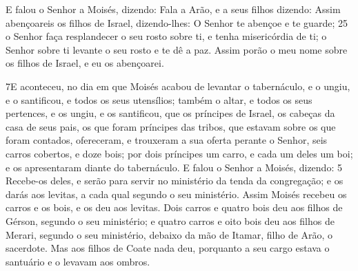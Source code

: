 E falou o Senhor a Moisés, dizendo: Fala a Arão, e a seus
filhos dizendo: Assim abençoareis os filhos de Israel, dizendo-lhes:
O Senhor te abençoe e te guarde; 25 o Senhor faça
resplandecer o seu rosto sobre ti, e tenha misericórdia de ti;
o Senhor sobre ti levante o seu rosto e te dê a paz.
Assim porão o meu nome sobre os filhos de Israel, e eu os
abençoarei.

\medskip

\lettrine{7} E aconteceu, no dia em que Moisés acabou de
levantar o tabernáculo, e o ungiu, e o santificou, e todos os seus
utensílios; também o altar, e todos os seus pertences, e os ungiu, e
os santificou, que os príncipes de Israel, os cabeças da casa de
seus pais, os que foram príncipes das tribos, que estavam sobre os
que foram contados, ofereceram, e trouxeram a sua oferta perante
o Senhor, seis carros cobertos, e doze bois; por dois príncipes um
carro, e cada um deles um boi; e os apresentaram diante do
tabernáculo. E falou o Senhor a Moisés, dizendo: 5 Recebe-os
deles, e serão para servir no ministério da tenda da congregação; e
os darás aos levitas, a cada qual segundo o seu ministério.
Assim Moisés recebeu os carros e os bois, e os deu aos levitas.
Dois carros e quatro bois deu aos filhos de Gérson, segundo o
seu ministério; e quatro carros e oito bois deu aos filhos de
Merari, segundo o seu ministério, debaixo da mão de Itamar, filho de
Arão, o sacerdote. Mas aos filhos de Coate nada deu, porquanto a
seu cargo estava o santuário e o levavam aos ombros.

